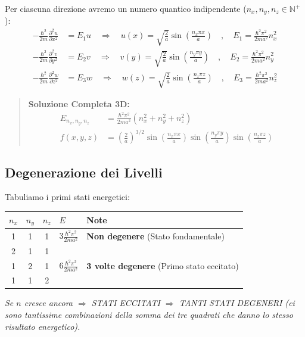 \documentclass[11pt, a4paper]{article}
\begin{document}
\noindent
Per ciascuna direzione avremo un numero quantico indipendente ($n_x, n_y, n_z \in \mathbb{N}^+$): %
\begin{align*}
    -\frac{\hbar^2}{2m} \frac{\partial^2 u}{\partial x^2} &= E_1 u \quad \Rightarrow \quad u(x) = \sqrt{\frac{2}{a}} \sin\left(\frac{n_x \pi x}{a}\right) \quad , \quad E_1 = \frac{\hbar^2 \pi^2}{2ma^2} n_x^2 \\ %
    -\frac{\hbar^2}{2m} \frac{\partial^2 v}{\partial y^2} &= E_2 v \quad \Rightarrow \quad v(y) = \sqrt{\frac{2}{a}} \sin\left(\frac{n_y \pi y}{a}\right) \quad , \quad E_2 = \frac{\hbar^2 \pi^2}{2ma^2} n_y^2 \\ %
    -\frac{\hbar^2}{2m} \frac{\partial^2 w}{\partial z^2} &= E_3 w \quad \Rightarrow \quad w(z) = \sqrt{\frac{2}{a}} \sin\left(\frac{n_z \pi z}{a}\right) \quad , \quad E_3 = \frac{\hbar^2 \pi^2}{2ma^2} n_z^2 %
\end{align*}

\begin{quote}
    \textbf{Soluzione Completa 3D:} %
    \begin{align}
        E_{n_x, n_y, n_z} &= \frac{\hbar^2 \pi^2}{2ma^2} \left( n_x^2 + n_y^2 + n_z^2 \right) \\ %
        f(x,y,z) &= \left(\frac{2}{a}\right)^{3/2} \sin\left(\frac{n_x \pi x}{a}\right) \sin\left(\frac{n_y \pi y}{a}\right) \sin\left(\frac{n_z \pi z}{a}\right) %
    \end{align}
\end{quote}

\subsection{Degenerazione dei Livelli} %

Tabuliamo i primi stati energetici: %
\begin{center}
\begin{tabular}{|c|c|c|l|l|}
\hline
$n_x$ & $n_y$ & $n_z$ & $E$ & \textbf{Note} \\
\hline
1 & 1 & 1 & $3 \frac{\hbar^2 \pi^2}{2ma^2}$ & \textbf{Non degenere} (Stato fondamentale) \\
\hline
2 & 1 & 1 & \multirow{3}{*}{$6 \frac{\hbar^2 \pi^2}{2ma^2}$} & \multirow{3}{*}{\textbf{3 volte degenere} (Primo stato eccitato)} \\
1 & 2 & 1 & & \\
1 & 1 & 2 & & \\
\hline
\end{tabular}
\end{center}
\textit{Se $n$ cresce ancora $\Rightarrow$ STATI ECCITATI $\Rightarrow$ TANTI STATI DEGENERI (ci sono tantissime combinazioni della somma dei tre quadrati che danno lo stesso risultato energetico).} %
\end{document}
